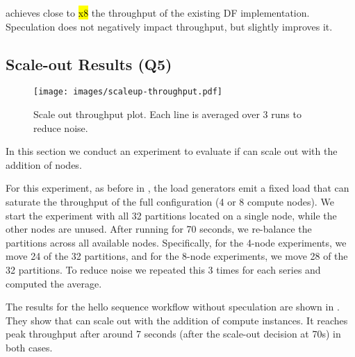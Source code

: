 %
\sys achieves close to \hl{x8} the throughput of the existing DF implementation. Speculation does not negatively impact throughput, but slightly improves it.

\subsection{Scale-out Results (Q5)}
\label{ssec:eval-scaleout}

\begin{figure}
    \centering
    \texttt{[image: images/scaleup-throughput.pdf]}
    \caption{Scale out throughput plot. Each line is averaged over 3 runs to reduce noise.}
    \label{fig:scaleout}
\end{figure}

In this section we conduct an experiment to evaluate if \sys can scale out with the addition of nodes.

%
For this experiment, as before in , the load generators emit a fixed load that can saturate the throughput of the full configuration (4 or 8 compute nodes). We start the experiment with all 32 partitions located on a single node, while the other nodes are unused. After running for 70 seconds, we re-balance the partitions across all available nodes. Specifically, for the 4-node experiments, we move 24 of the 32 partitions, and for the 8-node experiments, we move 28 of the 32 partitions. To reduce noise we repeated this 3 times for each series and computed the average.

 The results for the hello sequence workflow without speculation are shown in . They show that \sys can scale out with the addition of compute instances. It reaches peak throughput after around 7 seconds (after the scale-out decision at 70s) in both cases. 
\str
